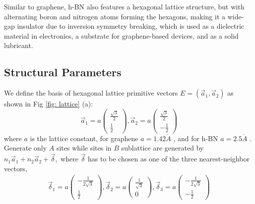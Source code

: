 Similar to graphene, \gls{h-BN} also features a hexagonal lattice structure, but with alternating boron and nitrogen atoms forming the hexagons, making it a wide-gap insulator due to inversion symmetry breaking, which is used as a dielectric material in electronics, a substrate for graphene-based devices, and as a solid lubricant.
\subsection{Structural Parameters}
We define the basis of hexagonal lattice primitive vectors $E = (\vec{a}_{1}, \vec{a}_{2})$ as shown in Fig \ref{fig: lattice} (a):
$$
	\vec{a}_{1}=a\left(\begin{array}{l}
			\frac{\sqrt{3}}{2} \\
			\frac{1}{2}
		\end{array}\right),
	\vec{a}_{2}=a\left(\begin{array}{l}
			\frac{\sqrt{3}}{2} \\
			-\frac{1}{2}
		\end{array}\right)
$$
where $a$ is the lattice constant, for graphene $a= 1.42 \mathring{A}$ \cite{sarma2011electronic}, and for \gls{h-BN} $a= 2.5 \mathring{A}$ \cite{PhysRevB.81.155433}. Generate only $A$ sites while sites in $B$ sublattice are generated by $n_{1} \vec{a}_{1}+n_{2} \vec{a}_{2}+\vec{\delta},$ where $\vec{\delta}$ has to be chosen as one of the three nearest-neighbor vectors,
$$
	\begin{array}{c}
		\vec{\delta}_{1}=a\left(\begin{array}{l}
				                        -\frac{1}{2 \sqrt{3}} \\ \frac{1}{2}\end{array}\right),
		\vec{\delta}_{2}=a\left(\begin{array}{l}\frac{1}{\sqrt{3}}\\ 0 \end{array}\right),
		\vec{\delta}_{3}=a\left(\begin{array}{l} -\frac{1}{2 \sqrt{3}}\\ -\frac{1}{2}\end{array}\right)
	\end{array}
$$
